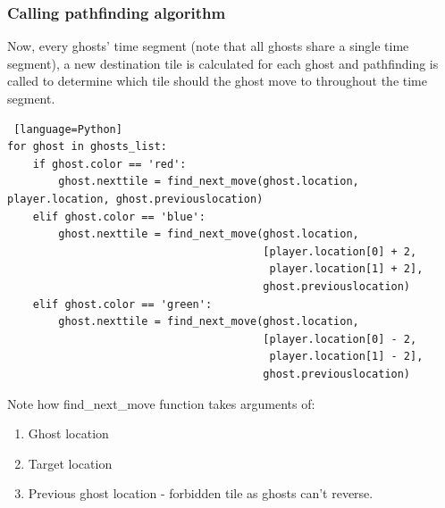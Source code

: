 \documentclass[11pt,a4paper,notitlepage]{report}
\begin{document}
				\subsubsection{Calling pathfinding algorithm}
					Now, every ghosts' time segment (note that all ghosts share a single time segment), a new destination tile is calculated for each ghost and pathfinding is called to determine which tile should the ghost move to throughout the time segment.
					\begin{lstlisting} [language=Python]
for ghost in ghosts_list:
    if ghost.color == 'red':
        ghost.nexttile = find_next_move(ghost.location, player.location, ghost.previouslocation)
    elif ghost.color == 'blue':
        ghost.nexttile = find_next_move(ghost.location,
                                        [player.location[0] + 2,
                                         player.location[1] + 2],
                                        ghost.previouslocation)
    elif ghost.color == 'green':
        ghost.nexttile = find_next_move(ghost.location,
                                        [player.location[0] - 2,
                                         player.location[1] - 2],
                                        ghost.previouslocation)
					\end{lstlisting}
					Note how find\_next\_move function takes arguments of:
					\begin{enumerate}
						\item
							Ghost location
						\item
							Target location
						\item
							Previous ghost location - forbidden tile as ghosts can't reverse.
					\end{enumerate}
\end{document}
